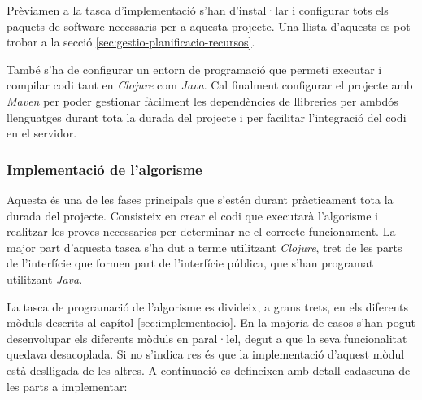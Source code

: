 Prèviamen a la tasca d'implementació s'han d'instal·lar i configurar tots els paquets de software necessaris per a aquesta projecte. Una llista d'aquests es pot trobar a la secció \ref{sec:gestio-planificacio-recursos}.

També s'ha de configurar un entorn de programació que permeti executar i compilar codi tant en \emph{Clojure} com \emph{Java}. Cal finalment configurar el projecte amb \emph{Maven} per poder gestionar fàcilment les dependències de llibreries per ambdós llenguatges durant tota la durada del projecte i per facilitar l'integració del codi en el servidor.

\subsubsection{Implementació de l'algorisme}

Aquesta és una de les fases principals que s'estén durant pràcticament tota la durada del projecte. Consisteix en crear el codi que executarà l'algorisme i realitzar les proves necessaries per determinar-ne el correcte funcionament. La major part d'aquesta tasca s'ha dut a terme utilitzant \emph{Clojure}, tret de les parts de l'interfície que formen part de l'interfície pública, que s'han programat utilitzant \emph{Java}.

La tasca de programació de l'algorisme es divideix, a grans trets, en els diferents mòduls descrits al capítol \ref{sec:implementacio}. En la majoria de casos s'han pogut desenvolupar els diferents mòduls en paral·lel, degut a que la seva funcionalitat quedava desacoplada. Si no s'indica res és que la implementació d'aquest mòdul està deslligada de les altres. A continuació es defineixen amb detall cadascuna de les parts a implementar:


